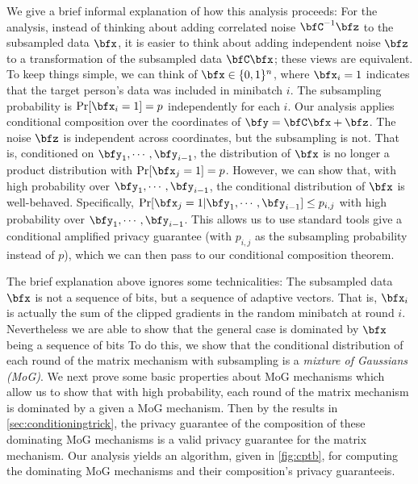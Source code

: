 We give a brief informal explanation of how this analysis proceeds:
For the analysis, instead of thinking about adding correlated noise $\bfC^{-1} \bfz$ to the subsampled data $\bfx$, it is easier to think about adding independent noise $\bfz$ to a transformation of the subsampled data $\bfC \bfx$; these views are equivalent.
To keep things simple, we can think of $\bfx \in \{0,1\}^n$, where $\bfx_i=1$ indicates that the target person's data was included in minibatch $i$. The subsampling probability is $\Pr[\bfx_i=1]=p$ independently for each $i$.
Our analysis applies conditional composition over the coordinates of $\bfy = \bfC \bfx + \bfz$. The noise $\bfz$ is independent across coordinates, but the subsampling is not. That is, conditioned on $\bfy_1, \cdots, \bfy_{i-1}$, the distribution of $\bfx$ is no longer a product distribution with $\Pr[\bfx_j=1]=p$. However, we can show that, with high probability over $\bfy_1, \cdots, \bfy_{i-1}$, the conditional distribution of $\bfx$ is well-behaved. 
Specifically, $\Pr[\bfx_j=1|\bfy_1, \cdots, \bfy_{i-1}]\le p_{i,j}$ with high probability over $\bfy_1, \cdots, \bfy_{i-1}$.
This allows us to use standard tools give a conditional amplified privacy guarantee (with $p_{i,j}$ as the subsampling probability instead of $p$), which we can then pass to our conditional composition theorem.

The brief explanation above ignores some technicalities:
The subsampled data $\bfx$ is not a sequence of bits, but a sequence of adaptive vectors. That is, $\bfx_i$ is actually the sum of the clipped gradients in the random minibatch at round $i$.
Nevertheless we are able to show that the general case is dominated by $\bfx$ being a sequence of bits
To do this, we show that the conditional distribution of each round of the matrix mechanism with subsampling is a \textit{mixture of Gaussians (MoG)}. We next prove some basic properties about MoG mechanisms which allow us to show that with high probability, each round of the matrix mechanism is dominated by a given a MoG mechanism. Then by the results in \cref{sec:conditioningtrick}, the privacy guarantee of the composition of these dominating MoG mechanisms is a valid privacy guarantee for the matrix mechanism. Our analysis yields an algorithm, \MMCC{} given in \cref{fig:cptb}, for computing the dominating MoG mechanisms and their composition's privacy guaranteeis. 

